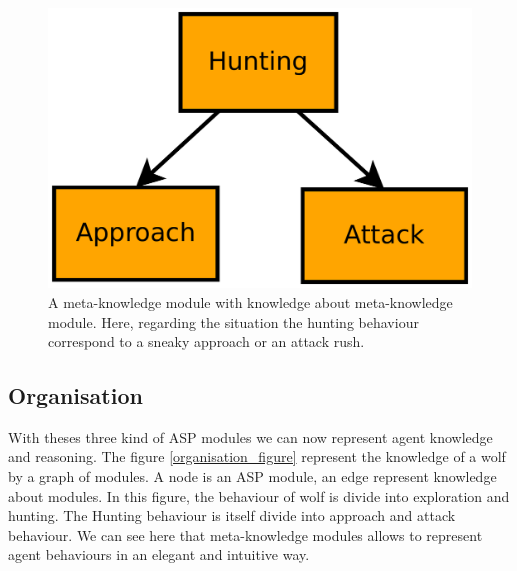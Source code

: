 \documentclass{aamas2012}
\begin{document}
	\begin{figure}
		\centering
		\includegraphics[keepaspectratio=true, scale=0.25]{hunting_behaviour.pdf}
		\caption
		{
			\label{hunting_figure}
			A meta-knowledge module with knowledge about meta-knowledge module.
			Here, regarding the situation the hunting behaviour correspond to a sneaky approach or an attack rush.
		}
	\end{figure}
	
\subsection{Organisation}

	With theses three kind of ASP modules we can now represent agent knowledge and reasoning.
	The figure \ref{organisation_figure} represent the knowledge of a wolf by a graph of modules.
	A node is an ASP module, an edge represent knowledge about modules.
	In this figure, the behaviour of wolf is divide into exploration and hunting.
	The Hunting behaviour is itself divide into approach and attack behaviour.
	We can see here that meta-knowledge modules allows to represent agent behaviours in an elegant and intuitive way.
\end{document}
